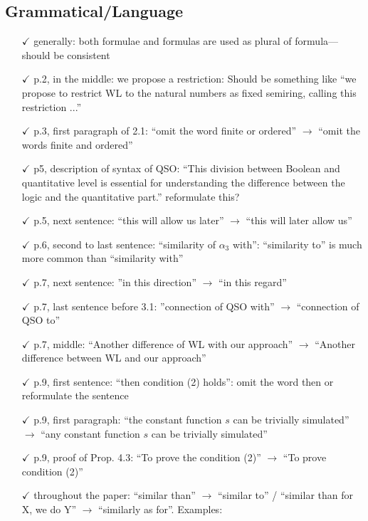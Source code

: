 \documentclass[a4paper]{article}
\begin{document}
\subsection*{Grammatical/Language}
\begin{itemize}
	\setlength\itemsep{0.5em}
	\item[$\checkmark$] generally: both formulae and formulas are used as plural of formula---should be consistent
	\item[$\checkmark$] p.2, in the middle: we propose a restriction: Should be something like ``we propose to restrict WL to the natural numbers as fixed semiring, calling this restriction ...''
	\item[$\checkmark$] p.3, first paragraph of 2.1: ``omit the word finite or ordered'' $\to$ ``omit the words finite and
	ordered''
	\item[$\checkmark$] p5, description of syntax of QSO: ``This division between Boolean and quantitative level is essential for understanding the difference between the logic and the quantitative part.'' reformulate this?
	\item[$\checkmark$] p.5, next sentence: ``this will allow us later'' $\to$ ``this will later allow us''
	\item[$\checkmark$] p.6, second to last sentence: ``similarity of $\alpha_3$ with'': ``similarity to'' is much more common
	than ``similarity with''
	\item[$\checkmark$] p.7, next sentence: ''in this direction'' $\to$ ``in this regard''
	\item[$\checkmark$] p.7, last sentence before 3.1: ''connection of QSO with'' $\to$ ``connection of QSO to''
	\item[$\checkmark$] p.7, middle: ``Another difference of WL with our approach'' $\to$ ``Another difference between
	WL and our approach''
	\item[$\checkmark$] p.9, first sentence: ``then condition (2) holds'': omit the word then or reformulate the sentence
	\item[$\checkmark$] p.9, first paragraph: ``the constant function $s$ can be trivially simulated'' $\to$ ``any constant
	function $s$ can be trivially simulated''
	\item[$\checkmark$] p.9, proof of Prop. 4.3: ``To prove the condition (2)'' $\to$ ``To prove condition (2)''
	\item[$\checkmark$] throughout the paper: ``similar than'' $\to$ ``similar to'' / ``similar than for X, we do Y'' $\to$
	``similarly as for''. Examples:
	\begin{itemize}

\end{itemize}
\end{itemize}
\end{document}
